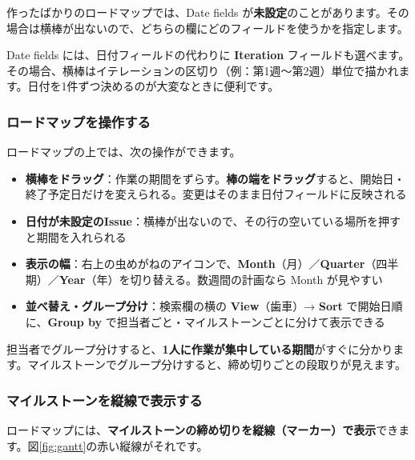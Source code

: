 作ったばかりのロードマップでは、Date fields が\textbf{未設定}のことがあります。その場合は横棒が出ないので、どちらの欄にどのフィールドを使うかを指定します。


\begin{notebox}
Date fields には、日付フィールドの代わりに \textbf{Iteration} フィールドも選べます。その場合、横棒はイテレーションの区切り（例：第1週〜第2週）単位で描かれます。日付を1件ずつ決めるのが大変なときに便利です。
\end{notebox}

\subsubsection{ロードマップを操作する}

ロードマップの上では、次の操作ができます。

\begin{itemize}[leftmargin=1.4em]
  \item \textbf{横棒をドラッグ}：作業の期間をずらす。\textbf{棒の端をドラッグ}すると、開始日・終了予定日だけを変えられる。変更はそのまま日付フィールドに反映される
  \item \textbf{日付が未設定のIssue}：横棒が出ないので、その行の空いている場所を押すと期間を入れられる
  \item \textbf{表示の幅}：右上の虫めがねのアイコンで、\textbf{Month}（月）／\textbf{Quarter}（四半期）／\textbf{Year}（年）を切り替える。数週間の計画なら Month が見やすい
  \item \textbf{並べ替え・グループ分け}：検索欄の横の \textbf{View}（歯車）→ \textbf{Sort} で開始日順に、\textbf{Group by} で担当者ごと・マイルストーンごとに分けて表示できる
\end{itemize}

担当者でグループ分けすると、\textbf{1人に作業が集中している期間}がすぐに分かります。マイルストーンでグループ分けすると、締め切りごとの段取りが見えます。

\subsubsection{マイルストーンを縦線で表示する}

ロードマップには、\textbf{マイルストーンの締め切りを縦線（マーカー）で表示}できます。図\ref{fig:gantt}の赤い縦線がそれです。


